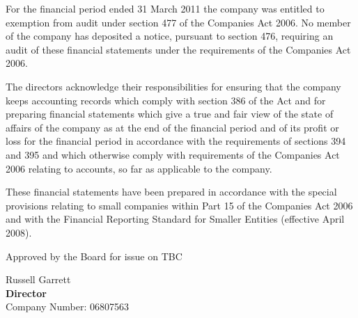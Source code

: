 {\footnotesize For the financial period ended 31 March 2011 the
company was entitled to exemption from audit under section 477 of the
Companies Act 2006. No member of the company has deposited a
notice, pursuant to section 476, requiring an audit of these
financial statements under the requirements of the Companies Act
2006.

The directors acknowledge their responsibilities for ensuring that
the company keeps accounting records which comply with section 386
of the Act and for preparing financial statements which give a true
and fair view of the state of affairs of the company as at the end
of the financial period and of its profit or loss for the financial
period in accordance with the requirements of sections 394 and 395
and which otherwise comply with requirements of the Companies Act
2006 relating to accounts, so far as applicable to the company.

These financial statements have been prepared in accordance with
the special provisions relating to small companies within Part 15
of the Companies Act 2006 and with the Financial Reporting Standard
for Smaller Entities (effective April 2008).}

\vfill

Approved by the Board for issue on TBC
\vspace{48pt}

Russell Garrett \\
{\bf Director} \\
Company Number: 06807563
